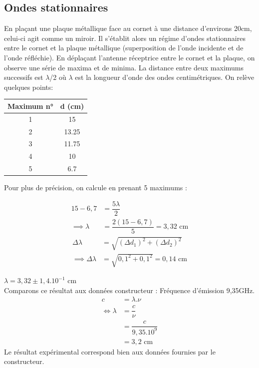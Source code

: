 \documentclass[12pt,a4paper]{article}
\begin{document}
	\subsection{Ondes stationnaires}
	En plaçant une plaque métallique face au cornet à une distance d'environs 20cm, celui-ci agit comme un miroir. Il s'établit alors un régime d'ondes stationnaires entre le cornet et la plaque métallique (superposition de l'onde incidente et de l'onde réfléchie). En déplaçant l'antenne réceptrice entre le cornet et la plaque, on observe une série de maxima et de minima. La distance entre deux maximums successifs est $\lambda$/2 où $\lambda$ est la longueur d'onde des ondes centimétriques. On relève quelques points:
	\begin{center}
		\begin{tabular}{|c|c|}
			\hline 
			Maximum n° & d (cm) \\ 
			\hline 
			1 & 15 \\ 
			\hline 
			2 & 13.25 \\ 
			\hline 
			3 & 11.75 \\ 
			\hline 
			4 & 10 \\ 
			\hline 
			5 & 6.7 \\ 
			\hline 
		\end{tabular} 
	\end{center}
	Pour plus de précision, on calcule en prenant 5 maximums : 
	\setlength\columnseprule{0.5pt}
	\begin{multicols}{2}
		\begin{align*}
		15-6,7 &= \dfrac{5\lambda}{2}\\
		\implies \lambda &= \dfrac{2(15-6,7)}{5}=3,32 \text{ cm}
		\end{align*}
		\vfill
		\columnbreak
		\begin{align*}
		\Delta \lambda &= \sqrt {\left( \Delta d_{1}\right) ^{2}+\left( \Delta d_{2}\right) ^{2}}\\
		\implies \Delta \lambda &= \sqrt {0,1^2+0,1^2}=0,14 \text{ cm}
		\end{align*}
	\end{multicols}
	$\lambda = 3,32\pm1,4.10^{-1}$ cm\\
	Comparons ce résultat aux données constructeur : Fréquence d'émission 9,35GHz.
	\begin{align*}
	c &= \lambda.\nu\\
	\iff \lambda &= \dfrac{c}{\nu}\\
	&=\dfrac{c}{9,35.10^9}\\
	&=3,2 \text{ cm}
	\end{align*}
	Le résultat expérimental correspond bien aux données fournies par le constructeur. 
	
\end{document}
